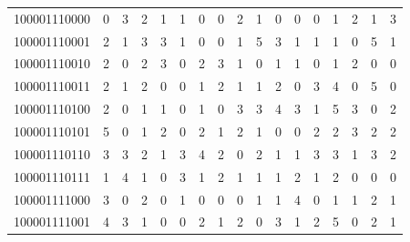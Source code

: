 \documentclass[10pt,a4paper]{article}
\begin{document}
\begin{longtable}{ |c|c|c|c|c|c|c|c|c|c|c|c|c|c|c|c|c| }
    100001110000              & 0                            & 3                                & 2                            & 1                              & 1   & 0   & 0   & 2   & 1   & 0   & 0   & 0   & 1   & 2   & 1   & 3   \\
    100001110001              & 2                            & 1                                & 3                            & 3                              & 1   & 0   & 0   & 1   & 5   & 3   & 1   & 1   & 1   & 0   & 5   & 1   \\
    100001110010              & 2                            & 0                                & 2                            & 3                              & 0   & 2   & 3   & 1   & 0   & 1   & 1   & 0   & 1   & 2   & 0   & 0   \\
    100001110011              & 2                            & 1                                & 2                            & 0                              & 0   & 1   & 2   & 1   & 1   & 2   & 0   & 3   & 4   & 0   & 5   & 0   \\
    100001110100              & 2                            & 0                                & 1                            & 1                              & 0   & 1   & 0   & 3   & 3   & 4   & 3   & 1   & 5   & 3   & 0   & 2   \\
    100001110101              & 5                            & 0                                & 1                            & 2                              & 0   & 2   & 1   & 2   & 1   & 0   & 0   & 2   & 2   & 3   & 2   & 2   \\
    100001110110              & 3                            & 3                                & 2                            & 1                              & 3   & 4   & 2   & 0   & 2   & 1   & 1   & 3   & 3   & 1   & 3   & 2   \\
    100001110111              & 1                            & 4                                & 1                            & 0                              & 3   & 1   & 2   & 1   & 1   & 1   & 2   & 1   & 2   & 0   & 0   & 0   \\
    100001111000              & 3                            & 0                                & 2                            & 0                              & 1   & 0   & 0   & 0   & 1   & 1   & 4   & 0   & 1   & 1   & 2   & 1   \\
    100001111001              & 4                            & 3                                & 1                            & 0                              & 0   & 2   & 1   & 2   & 0   & 3   & 1   & 2   & 5   & 0   & 2   & 1   \\

\end{longtable}
\end{document}
